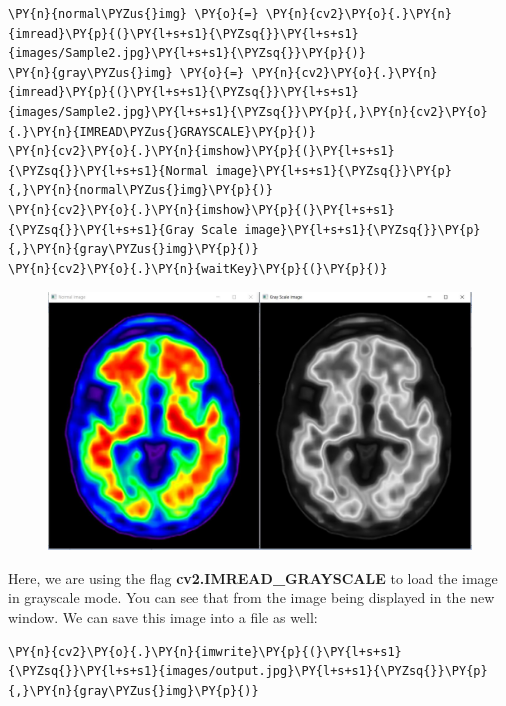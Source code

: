 \begin{tcolorbox}[breakable, size=fbox, boxrule=1pt, pad at break*=1mm,colback=cellbackground, colframe=cellborder]
	\begin{Verbatim}[commandchars=\\\{\}]
\PY{n}{normal\PYZus{}img} \PY{o}{=} \PY{n}{cv2}\PY{o}{.}\PY{n}{imread}\PY{p}{(}\PY{l+s+s1}{\PYZsq{}}\PY{l+s+s1}{images/Sample2.jpg}\PY{l+s+s1}{\PYZsq{}}\PY{p}{)}
\PY{n}{gray\PYZus{}img} \PY{o}{=} \PY{n}{cv2}\PY{o}{.}\PY{n}{imread}\PY{p}{(}\PY{l+s+s1}{\PYZsq{}}\PY{l+s+s1}{images/Sample2.jpg}\PY{l+s+s1}{\PYZsq{}}\PY{p}{,}\PY{n}{cv2}\PY{o}{.}\PY{n}{IMREAD\PYZus{}GRAYSCALE}\PY{p}{)}
\PY{n}{cv2}\PY{o}{.}\PY{n}{imshow}\PY{p}{(}\PY{l+s+s1}{\PYZsq{}}\PY{l+s+s1}{Normal image}\PY{l+s+s1}{\PYZsq{}}\PY{p}{,}\PY{n}{normal\PYZus{}img}\PY{p}{)}
\PY{n}{cv2}\PY{o}{.}\PY{n}{imshow}\PY{p}{(}\PY{l+s+s1}{\PYZsq{}}\PY{l+s+s1}{Gray Scale image}\PY{l+s+s1}{\PYZsq{}}\PY{p}{,}\PY{n}{gray\PYZus{}img}\PY{p}{)}
\PY{n}{cv2}\PY{o}{.}\PY{n}{waitKey}\PY{p}{(}\PY{p}{)}
	\end{Verbatim}
\end{tcolorbox}

\begin{figure}[htbp]
	\centerline{\includegraphics[width=0.8\columnwidth]{figures/p2.jpg}}
\end{figure}

Here, we are using the flag \textbf{cv2.IMREAD\_GRAYSCALE} to load the image in grayscale mode. You can see that from the 	image being displayed in the new window. We can save this image into a file as well:

\vspace{0.5cm}

\begin{tcolorbox}[breakable, size=fbox, boxrule=1pt, pad at break*=1mm,colback=cellbackground, colframe=cellborder]
	\begin{Verbatim}[commandchars=\\\{\}]
\PY{n}{cv2}\PY{o}{.}\PY{n}{imwrite}\PY{p}{(}\PY{l+s+s1}{\PYZsq{}}\PY{l+s+s1}{images/output.jpg}\PY{l+s+s1}{\PYZsq{}}\PY{p}{,}\PY{n}{gray\PYZus{}img}\PY{p}{)}
	\end{Verbatim}
\end{tcolorbox}

